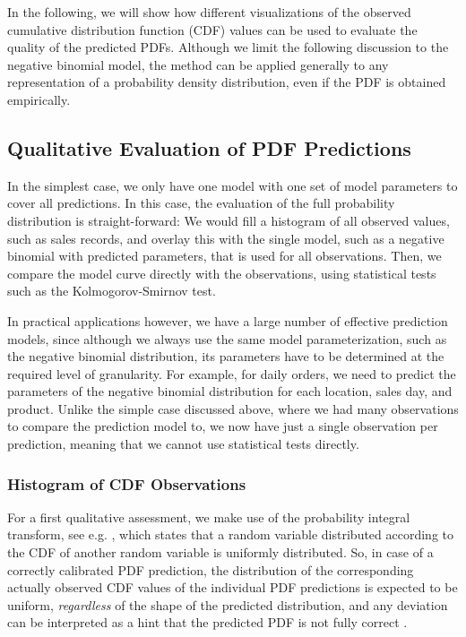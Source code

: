 \documentclass[BCOR=1mm, DIV=calc,10pt,
twoside=true,
twocolumn,
headings=normal]{scrartcl}
\begin{document}
In the following, we will show how different visualizations of the observed cumulative distribution function (CDF) values can be used to evaluate the quality of the predicted PDFs. Although we limit the following discussion to the negative binomial model, the method can be applied generally to any representation of a probability density distribution, even if the PDF is obtained empirically.

\subsection{Qualitative Evaluation of PDF Predictions}

In the simplest case, we only have one model with one set of model parameters to cover all predictions. In this case, the evaluation of the full probability distribution is straight-forward: We would fill a histogram of all observed values, such as sales records, and overlay this with the single model, such as a negative binomial with predicted parameters, that is used for all observations. Then, we compare the model curve directly with the observations, using statistical tests such as the Kolmogorov-Smirnov test.

In practical applications however, we have a large number of effective prediction models, since although we always use the same model parameterization, such as the negative binomial distribution, its parameters have to be determined at the required level of granularity. For example, for daily orders, we need to predict the parameters of the negative binomial distribution for each location, sales day, and product. Unlike the simple case discussed above, where we had many observations to compare the prediction model to, we now have just a single observation per prediction, meaning that we cannot use statistical tests directly.

\subsubsection{Histogram of CDF Observations}
\label{sec:cdf_histo}

For a first qualitative assessment, we make use of the probability integral transform, see e.g. \cite{Angus1994,casella2002statistical}, which states that a random variable distributed according to the CDF of another random variable is uniformly distributed. So, in case of a correctly calibrated PDF prediction, the distribution of the corresponding actually observed CDF values of the individual PDF predictions is expected to be uniform, {\em regardless} of the shape of the predicted distribution, and any deviation can be interpreted as a hint that the predicted PDF is not fully correct \cite{diebold1998vevaluating}.
\end{document}
